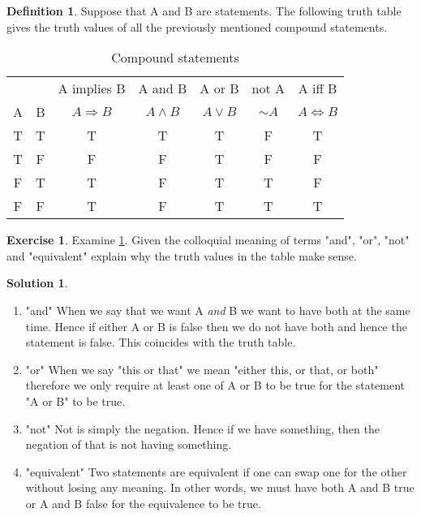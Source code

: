 \documentclass[a4paper, 11pt]{report}
\theoremstyle{plain}
\theoremstyle{definition}
\newtheorem{defn}[thm]{Definition}
\newtheorem{exrc}[thm]{Exercise}
\newtheorem*{sltn}{Solution}
\newcommand{\impl}{\Longrightarrow}
\newcommand{\eqvl}{\Longleftrightarrow}
\renewcommand{\neg}{{\sim}} %
\begin{document}
\begin{defn}
  Suppose that A and B are statements. The following truth table gives the
  truth values of all the previously mentioned compound statements.
  \begin{table}[h!]
    \centering
    \caption{Compound statements}
    \label{tab:comp_statements}
    \begin{tabular}{ccccccc}
    \hline 
    {} & {} & A implies B & A and B & A or B & not A & A iff B \\
     A & B & $A \impl B$ & $A \land B$ & $A \lor B$ & $\neg A$ & $A \eqvl B$ \\
     T& T& T& T& T& F& T \\
     T& F& F& F& T& F& F \\
     F& T& T& F& T& T& F \\
     F& F& T& F& T& T& T \\
    \hline
    \end{tabular}
  \end{table}
\end{defn}

\begin{exrc}
  Examine \cref{tab:comp_statements}. Given the colloquial meaning of terms
  "and", "or", "not" and "equivalent" explain why the truth values in the table
  make sense.
\end{exrc}
\begin{sltn}
\begin{enumerate}
  \item "and"
    When we say that we want A \textit{and} B we want to have both at the same
    time. Hence if either A or B is false then we do not have both and hence
    the statement is false. This coincides with the truth table.
  \item "or"
    When we say "this or that" we mean "either this, or that, or both"
    therefore we only require at least one of A or B to be true for the
    statement "A or B" to be true.
  \item "not"
    Not is simply the negation. Hence if we have something, then the negation
    of that is not having something.
  \item "equivalent"
    Two statements are equivalent if one can swap one for the other without
    losing any meaning. In other words, we must have both A and B true or A and
    B false for the equivalence to be true.
\end{enumerate}
\end{sltn}
\end{document}
